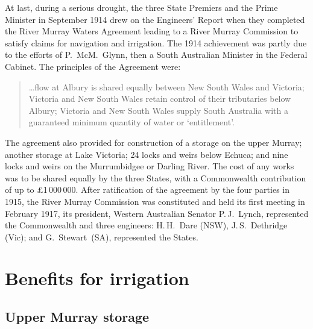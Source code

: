 At last, during a serious drought, the three State Premiers and the
Prime Minister in September 1914 drew on the Engineers' Report when
they completed the River Murray Waters Agreement leading to a River
Murray Commission  to satisfy claims
for navigation and irrigation. The 1914 achievement was partly due to
the efforts of P.~McM.~Glynn,  then a South
Australian Minister in the Federal Cabinet. The principles of the Agreement were:
\begin{quote}
	\ldots flow at Albury  is shared equally
	between New South Wales and Victoria; Victoria and New South
	Wales retain control of their tributaries below Albury;
	Victoria and New South Wales supply South Australia with a
	guaranteed minimum quantity of water or
	`entitlement'.
\end{quote}

The agreement also provided for construction of a storage on the upper
Murray; another storage at Lake Victoria;  24
locks and weirs  below Echuca;  and
nine locks and weirs on the Murrumbidgee or Darling
River.   The cost of
any works was to be shared equally by the three States, with a
Commonwealth contribution of up to \pounds1\,000\,000. After
ratification of the agreement by the four parties in 1915, the River
Murray Commission was constituted and held its first meeting in
February 1917, its president, Western Australian Senator P.\,J.~Lynch,
  represented the Commonwealth and three
engineers: H.\,H.~Dare (NSW),   J.\,S.~Dethridge
(Vic);  and G.~Stewart~(SA),   represented the States.

\section*{Benefits for irrigation}

\subsection*{Upper Murray storage}

